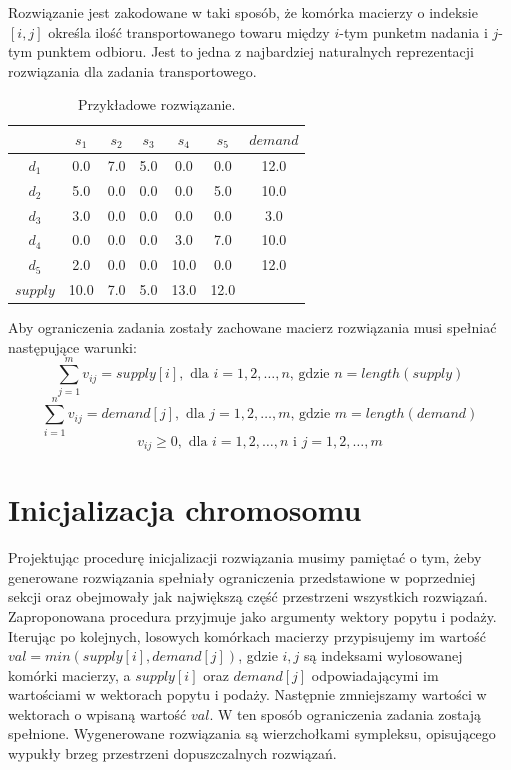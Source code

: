 Rozwiązanie jest zakodowane w taki sposób, że komórka macierzy o indeksie $[i, j]$ określa ilość transportowanego towaru 
między $i$-tym punketm nadania i $j$-tym punktem odbioru. Jest to jedna z najbardziej naturalnych reprezentacji rozwiązania 
dla zadania transportowego.

\begin{table}[h!]
    \begin{center}
        \begin{tabular}{c||ccccc||c}
              & $s_1$ & $s_2$ & $s_3$ & $s_4$ & $s_5$ & $demand$ \\ 
            \hline
            \hline
            $d_1$ & 0.0 & 7.0 & 5.0 & 0.0 & 0.0 & 12.0 \\
            $d_2$ & 5.0 & 0.0 & 0.0 & 0.0 & 5.0 & 10.0 \\
            $d_3$ & 3.0 & 0.0 & 0.0 & 0.0 & 0.0 & 3.0 \\
            $d_4$ & 0.0 & 0.0 & 0.0 & 3.0 & 7.0 & 10.0 \\
            $d_5$ & 2.0 & 0.0 & 0.0 & 10.0 & 0.0 & 12.0 \\
            \hline
            \hline
            $supply$ & 10.0 & 7.0 & 5.0 & 13.0 & 12.0 & \\ 
        \end{tabular}
    \end{center}
    \caption{Przykładowe rozwiązanie.}
\end{table}

Aby ograniczenia zadania zostały zachowane macierz rozwiązania musi spełniać następujące warunki:
$$\sum_{j=1}^{m} v_{ij} = supply[i], \text{ dla } i = 1, 2, \dots, n \text{, gdzie } n = length(supply)$$
$$\sum_{i=1}^{n} v_{ij} = demand[j], \text{ dla } j = 1, 2, \dots, m \text{, gdzie } m = length(demand)$$
$$v_{ij} \ge 0, \text{ dla } i = 1, 2, \dots, n \text{ i } j = 1, 2, \dots, m$$


\section{Inicjalizacja chromosomu}
Projektując procedurę inicjalizacji rozwiązania musimy pamiętać o tym, żeby generowane rozwiązania spełniały ograniczenia przedstawione 
w poprzedniej sekcji oraz obejmowały jak największą część przestrzeni wszystkich rozwiązań. Zaproponowana procedura przyjmuje jako argumenty 
wektory popytu i podaży. Iterując po kolejnych, losowych komórkach macierzy przypisujemy im wartość $val = min(supply[i], demand[j])$, gdzie 
$i, j$ są indeksami wylosowanej komórki macierzy, a $supply[i]$ oraz $demand[j]$ odpowiadającymi im wartościami w wektorach popytu i podaży. 
Następnie zmniejszamy wartości w wektorach o wpisaną wartość $val$. W ten sposób ograniczenia zadania zostają spełnione. Wygenerowane rozwiązania są 
wierzchołkami sympleksu, opisującego wypukły brzeg przestrzeni dopuszczalnych rozwiązań.

